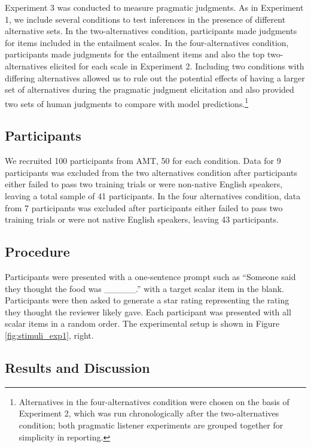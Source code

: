 \documentclass[10pt, letterpaper]{article}
\begin{document}
Experiment 3 was conducted to measure pragmatic judgments. As in
Experiment 1, we include several conditions to test inferences in the
presence of different alternative sets. In the two-alternatives
condition, participants made judgments for items included in the
entailment scales. In the four-alternatives condition, participants made
judgments for the entailment items and also the top two-alternatives
elicited for each scale in Experiment 2. Including two conditions with
differing alternatives allowed us to rule out the potential effects of
having a larger set of alternatives during the pragmatic judgment
elicitation and also provided two sets of human judgments to compare
with model
predictions.\footnote{Alternatives in the four-alternatives condition were chosen on the basis of Experiment 2, which was run chronologically after the two-alternatives condition; both pragmatic listener experiments are grouped together for simplicity in reporting.}

\subsection{Participants}\label{participants-2}

We recruited 100 participants from AMT, 50 for each condition. Data for
9 participants was excluded from the two alternatives condition after
participants either failed to pass two training trials or were
non-native English speakers, leaving a total sample of 41 participants.
In the four alternatives condition, data from 7 participants was
excluded after participants either failed to pass two training trials or
were not native English speakers, leaving 43 participants.

\subsection{Procedure}\label{procedure}

Participants were presented with a one-sentence prompt such as ``Someone
said they thought the food was \_\_\_\_\_.'' with a target scalar item
in the blank. Participants were then asked to generate a star rating
representing the rating they thought the reviewer likely gave. Each
participant was presented with all scalar items in a random order. The
experimental setup is shown in Figure \ref{fig:stimuli_exp1}, right.

\subsection{Results and Discussion}\label{results-and-discussion-2}
\end{document}
